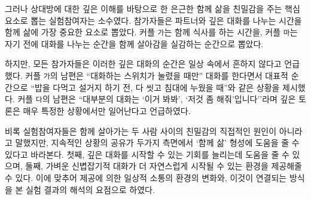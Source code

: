 그러나 상대방에 대한 깊은 이해를 바탕으로 한 은근한 함께 삶을 친밀감을 주는 핵심 요소로 뽑는 실험참여자는 소수였다. 참가자들은 파트너와 깊은 대화를 나누는 시간을 함께 삶에 가장 중요한 요소로 뽑았다. 커플 \texttt{가}는 함께 식사를 하는 시간을, 커플 \texttt{마}는 자기 전에 대화를 나누는 순간을 함께 살아감을 실감하는 순간으로 뽑았다.



하지만, 모든 참가자들은 이러한 깊은 대화의 순간은 일상 속에서 흔하지 않다고 언급했다. 커플 \texttt{가}의 남편은 ``대화하는 스위치가 눌렸을 때만'' 대화를 한다면서 대표적 순간으로 ``밥을 다먹고 설거지 하기 전, 다 씻고 침대에 누웠을 때''와 같은 상황을 제시했다. 커플 \texttt{다}의 남편은 ``대부분의 대화는 `이거 봐봐', `저것 좀 해줘'입니다''라며 깊은 토론은 매우 특정한 상황에서만 일어난다고 언급하였다.



비록 실험참여자들은 \concept\가 함께 살아가는 두 사람 사이의 친밀감의 직접적인 원인이 아니라고 말했지만, 지속적인 상황의 공유가 두가지 측면에서 `함께 삶' 형성에 도움을 줄 수 있다고 바라본다. 첫째, 깊은 대화를 시작할 수 있는 기회를 늘리는데 도움을 줄 수 있으며, 둘째, 가벼운 신볍잡기적 대화가 더 자연스럽게 시작될 수 있는 환경을 제공해줄 수 있다. 이에 맞추어  제공에 의한 일상적 소통의 환경의 변화와, 이것이 \concept\와 연결되는 방식을 본 실험 결과의 해석의 요점으로 하였다. 


